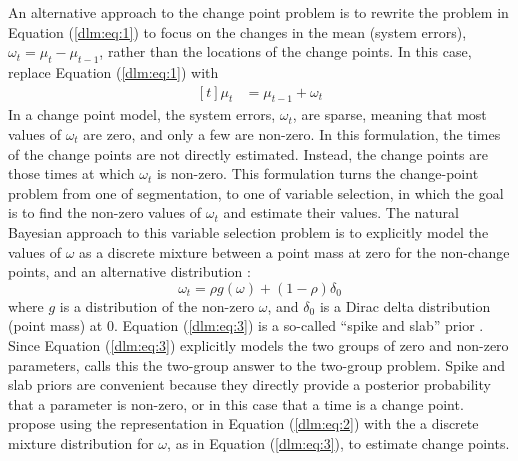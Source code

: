 \documentclass[12pt]{article}
\begin{document}
An alternative approach to the change point problem is to rewrite the problem in Equation (\ref{dlm:eq:1}) to focus on the changes in the mean (system errors), $\omega_{t} = \mu_{t} - \mu_{t - 1}$, rather than the locations of the change points.
In this case, replace Equation (\ref{dlm:eq:1}) with
\begin{equation}
  \label{dlm:eq:2}
  \begin{aligned}[t]
    \mu_{t} &= \mu_{t - 1} + \omega_{t}
  \end{aligned}
\end{equation}
In a change point model, the system errors, $\omega_{t}$, are sparse, meaning that most values of $\omega_{t}$ are zero, and only a few are non-zero.
In this formulation, the times of the change points are not directly estimated.
Instead, the change points are those times at which $\omega_{t}$ is non-zero.
This formulation turns the change-point problem from one of segmentation, to one of variable selection, in which the goal is to find the non-zero values of $\omega_{t}$ and estimate their values.
The natural Bayesian approach to this variable selection problem is to explicitly model the values of $\omega$ as a discrete mixture between a point mass at zero for the non-change points, and an alternative distribution \parencites{MitchellBeauchamp1988a}{Efron2008a}:
\begin{equation}
  \label{dlm:eq:3}
  \omega_{t} = \rho g(\omega) + (1 - \rho) \delta_{0}
\end{equation}
where $g$ is a distribution of the non-zero $\omega$, and $\delta_{0}$ is a Dirac delta distribution (point mass) at 0.
Equation (\ref{dlm:eq:3}) is a so-called ``spike and slab'' prior \parencite{MitchellBeauchamp1988a}.
Since Equation (\ref{dlm:eq:3}) explicitly models the two groups of zero and non-zero parameters, \textcite{Efron2008a} calls this the two-group answer to the two-group problem.
Spike and slab priors are convenient because they directly provide a posterior probability that a parameter is non-zero, or in this case that a time is a change point.
\textcite{GiordaniKohn2008} propose using the representation in Equation (\ref{dlm:eq:2}) with the a discrete mixture distribution for $\omega$, as in Equation (\ref{dlm:eq:3}), to estimate change points.
\end{document}
